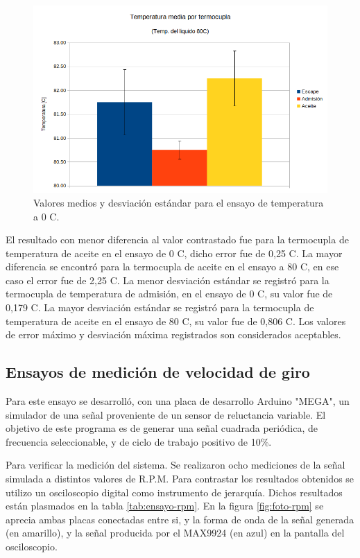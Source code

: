 \begin{figure}[htpb]
\centering
\includegraphics[width=.9\textwidth]{./Figures/temp-80c.png}
\caption{Valores medios y desviación estándar para el ensayo de temperatura a 0 \degree C.}
\label{fig:temp-80c}
\end{figure}

El resultado con menor diferencia al valor contrastado fue para la termocupla de temperatura de aceite en el ensayo de 0 \degree C, dicho error fue de 0,25 \degree C. La mayor diferencia se encontró para la termocupla de aceite en el ensayo a 80 \degree C, en ese caso el error fue de 2,25 \degree C. La menor desviación estándar se registró para la termocupla de temperatura de admisión, en el ensayo de 0 \degree C, su valor fue de 0,179 \degree C. La mayor desviación estándar se registró para la termocupla de temperatura de aceite en el ensayo de 80 \degree C, su valor fue de 0,806 \degree C.  Los valores de error máximo y desviación máxima registrados son considerados aceptables.

\break

\subsection{Ensayos de medición de velocidad de giro}

Para este ensayo se desarrolló, con una placa de desarrollo Arduino "MEGA", un simulador de una señal proveniente de un sensor de reluctancia variable. El objetivo de este programa es de generar una señal cuadrada periódica, de frecuencia seleccionable, y de ciclo de trabajo positivo de 10\%.

Para verificar la medición del sistema. Se realizaron ocho mediciones de la señal simulada a distintos valores de R.P.M. Para contrastar los resultados obtenidos se utilizo un osciloscopio digital como instrumento de jerarquía. Dichos resultados están plasmados en la tabla \ref{tab:ensayo-rpm}. En la figura \ref{fig:foto-rpm} se aprecia ambas placas conectadas entre si, y la forma de onda de la señal generada (en amarillo), y la señal producida por el MAX9924 (en azul) en la pantalla del osciloscopio.


